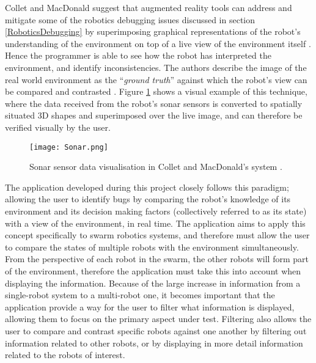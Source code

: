 Collet and MacDonald \cite{Collet:2006} suggest that augmented reality tools can address and mitigate some of the robotics debugging issues discussed in section \ref{RoboticsDebugging} by superimposing graphical representations of the robot's understanding of the environment on top of a live view of the environment itself \cite{Collet:2006}. Hence the programmer is able to see how the robot has interpreted the environment, and identify inconsistencies. The authors describe the image of the real world environment as the ``\textit{ground truth}'' against which the robot's view can be compared and contrasted \cite{Collet:2006}. Figure \ref{fig:Sonar} shows a visual example of this technique, where the data received from the robot's sonar sensors is converted to spatially situated 3D shapes and superimposed over the live image, and can therefore be verified visually by the user.

\begin{figure}
	\begin{center}
	\texttt{[image: Sonar.png]}
	\decoRule
	\caption[Sonar data visualisation. Collet and MacDonald \cite{Collet:2006}]{Sonar sensor data visualisation in Collet and MacDonald's system \cite{Collet:2006}.}
	\label{fig:Sonar}
	\end{center}
\end{figure}

The application developed during this project closely follows this paradigm; allowing the user to identify bugs by comparing the robot's knowledge of its environment and its decision making factors (collectively referred to as its state) with a view of the environment, in real time. The application aims to apply this concept specifically to swarm robotics systems, and therefore must allow the user to compare the states of multiple robots with the environment simultaneously. From the perspective of each robot in the swarm, the other robots will form part of the environment, therefore the application must take this into account when displaying the information. Because of the large increase in information from a single-robot system to a multi-robot one, it becomes important that the application provide a way for the user to filter what information is displayed, allowing them to focus on the primary aspect under test. Filtering also allows the user to compare and contrast specific robots against one another by filtering out information related to other robots, or by displaying in more detail information related to the robots of interest.

